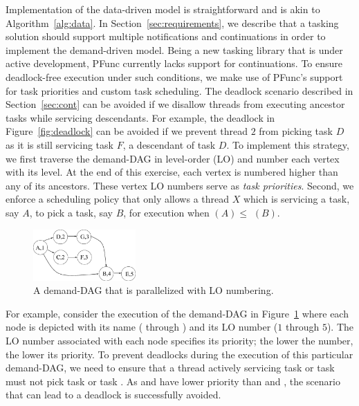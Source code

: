 \documentclass[10pt,conference]{IEEEtran}
\begin{document}
Implementation of the data-driven model is straightforward and is akin to
Algorithm~\ref{alg:data}. In Section~\ref{sec:requirements}, we describe that
a tasking solution should support multiple notifications and continuations in
order to implement the demand-driven model. Being a new tasking library that is
under active development, PFunc currently lacks support for continuations. To
ensure deadlock-free execution under such conditions, we make use of PFunc's
support for task priorities and custom task scheduling. The deadlock scenario
described in Section~\ref{sec:cont} can be avoided if we disallow threads from
executing ancestor tasks while servicing descendants. For example, the deadlock
in Figure~\ref{fig:deadlock} can be avoided if we prevent thread $2$ from
picking task $D$ as it is still servicing task $F$, a descendant of task $D$.
To implement this strategy, we first traverse the demand-DAG in level-order (LO)
and number each vertex with its level. At the end of this exercise, each vertex
is numbered higher than any of its ancestors. These vertex LO numbers serve as
\textit{task priorities}.  Second, we enforce a scheduling policy that only
allows a thread $X$ which is servicing a task, say $A$, to pick a task, say $B$,
for execution when $(A) \le$ $(B)$.

\begin{figure}[t]
\centering
\includegraphics[width=0.35\textwidth]{figs/stealing.eps}
\caption{A demand-DAG that is parallelized with LO numbering.}
\label{fig:stealing}
\end{figure}

%
For example, consider the execution of the demand-DAG in
Figure~\ref{fig:stealing} where each node is depicted with its name (
through ) and its LO number ($1$ through $5$). The LO number associated
with each node specifies its priority; the lower the number, the lower its
priority. To prevent deadlocks during the execution of this particular
demand-DAG, we need to ensure that a thread actively servicing task  or
task  must not pick task  or task . As  and
 have lower priority than  and , the scenario that can
lead to a deadlock is successfully avoided.
\end{document}
